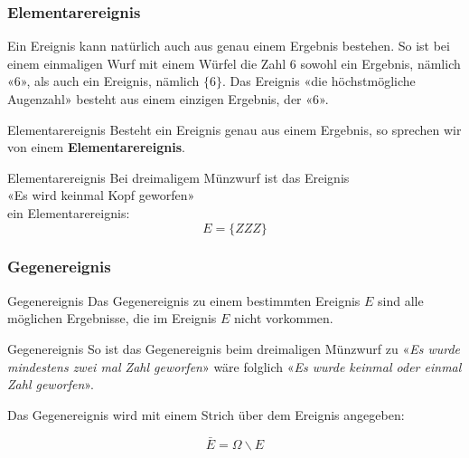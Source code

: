 \newpage
\subsubsection{Elementarereignis}
\begin{bemerkung}{}{}
  Ein Ereignis kann natürlich auch aus genau einem Ergebnis
  bestehen. So ist bei einem einmaligen Wurf mit einem Würfel die Zahl
  6 sowohl ein Ergebnis, nämlich «6», als auch ein Ereignis, nämlich
  $\{6\}$. Das Ereignis «die höchstmögliche Augenzahl» besteht aus
  einem einzigen Ergebnis, der «6».
  \end{bemerkung}

\begin{definition}{Elementarereignis}{}
Besteht ein Ereignis genau aus einem Ergebnis, so sprechen wir von einem \textbf{Elementarereignis}.
\end{definition}

\begin{beispiel}{Elementarereignis}{}
  Bei dreimaligem Münzwurf ist das Ereignis\\
  «Es wird keinmal Kopf geworfen»\\
  ein Elementarereignis:\\

  $$E = \{ZZZ\}$$
\end{beispiel}




\newpage
\subsubsection{Gegenereignis}
\begin{definition}{Gegenereignis}{}
  Das Gegenereignis zu einem bestimmten Ereignis $E$ sind alle möglichen Ergebnisse,
  die im Ereignis $E$ nicht vorkommen.
\end{definition}

\begin{beispiel}{Gegenereignis}{}
So ist das Gegenereignis beim dreimaligen Münzwurf zu «\textit{Es wurde mindestens zwei mal Zahl
geworfen}» wäre folglich «\textit{Es wurde keinmal oder einmal Zahl geworfen}».
\end{beispiel}

\vspace{2mm}


\begin{definition}{}{}
Das Gegenereignis wird mit einem Strich über dem Ereignis angegeben:

$$\bar{E} = \Omega \backslash E$$
\end{definition}

